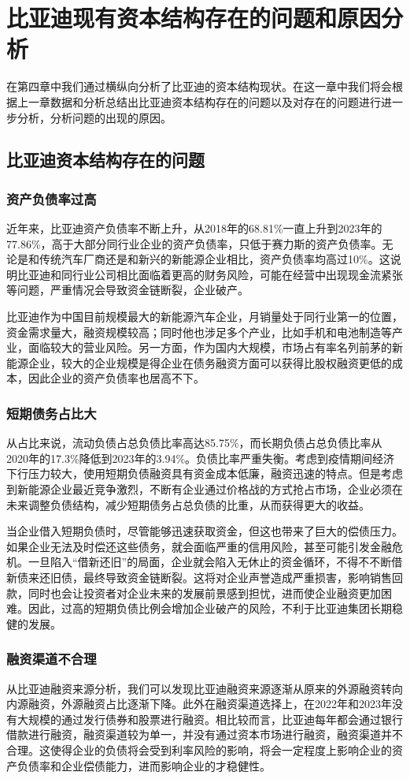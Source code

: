 \chapter{比亚迪现有资本结构存在的问题和原因分析}
在第四章中我们通过横纵向分析了比亚迪的资本结构现状。在这一章中我们将会根据上一章数据和分析总结出比亚迪资本结构存在的问题以及对存在的问题进行进一步分析，分析问题的出现的原因。 
\section{比亚迪资本结构存在的问题}

\subsection{资产负债率过高}
近年来，比亚迪资产负债率不断上升，从2018年的68.81\%一直上升到2023年的77.86\%，高于大部分同行业企业的资产负债率，只低于赛力斯的资产负债率。无论是和传统汽车厂商还是和新兴的新能源企业相比，资产负债率均高过10\%。这说明比亚迪和同行业公司相比面临着更高的财务风险，可能在经营中出现现金流紧张等问题，严重情况会导致资金链断裂，企业破产。

比亚迪作为中国目前规模最大的新能源汽车企业，月销量处于同行业第一的位置，资金需求量大，融资规模较高；同时他也涉足多个产业，比如手机和电池制造等产业，面临较大的营业风险。另一方面，作为国内大规模，市场占有率名列前茅的新能源企业，较大的企业规模是得企业在债务融资方面可以获得比股权融资更低的成本，因此企业的资产负债率也居高不下。
\subsection{短期债务占比大}
从占比来说，流动负债占总负债比率高达85.75\%，而长期负债占总负债比率从2020年的17.3\%降低到2023年的3.94\%。负债比率严重失衡。考虑到疫情期间经济下行压力较大，使用短期负债融资具有资金成本低廉，融资迅速的特点。但是考虑到新能源企业最近竞争激烈，不断有企业通过价格战的方式抢占市场，企业必须在未来调整负债结构，减少短期债务占总负债的比重，从而获得更大的收益。

当企业借入短期负债时，尽管能够迅速获取资金，但这也带来了巨大的偿债压力。如果企业无法及时偿还这些债务，就会面临严重的信用风险，甚至可能引发金融危机。一旦陷入“借新还旧”的局面，企业就会陷入无休止的资金循环，不得不不断借新债来还旧债，最终导致资金链断裂。这将对企业声誉造成严重损害，影响销售回款，同时也会让投资者对企业未来的发展前景感到担忧，进而使企业融资更加困难。因此，过高的短期负债比例会增加企业破产的风险，不利于比亚迪集团长期稳健的发展。
\subsection{融资渠道不合理}
从比亚迪融资来源分析，我们可以发现比亚迪融资来源逐渐从原来的外源融资转向内源融资，外源融资占比逐渐下降。此外在融资渠道选择上，在2022年和2023年没有大规模的通过发行债券和股票进行融资。相比较而言，比亚迪每年都会通过银行借款进行融资，融资渠道较为单一，并没有通过资本市场进行融资，融资渠道并不合理。这使得企业的负债将会受到利率风险的影响，将会一定程度上影响企业的资产负债率和企业偿债能力，进而影响企业的才稳健性。

